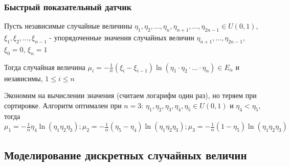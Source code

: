 \documentclass[12pt]{article}
\begin{document}
\subsubsection{Быстрый показательный датчик}

\begin{MyTheorem}
    \Ths Пусть независимые случайные величины $\eta_1, \eta_2, \dots, \eta_n, \eta_{n+1}, \dots, \eta_{2n - 1} \in U(0, 1)$, $\xi_1, \xi_2, \dots, \xi_{n - 1}$ - упорядоченные значения случайных величин $\eta_{n + 1}, \dots, \eta_{2n - 1}$, $\xi_0 = 0$, $\xi_n = 1$

    Тогда случайная величина $\mu_i = -\frac{1}{\alpha}(\xi_i - \xi_{i - 1}) \ln (\eta_1 \cdot \eta_2 \cdot \dots \cdot \eta_n) \in E_\alpha$ и независимы, $1 \leq i \leq n$
\end{MyTheorem}

Экономим на вычислении значения (считаем логарифм один раз), но теряем при сортировке. Алгоритм оптимален при $n = 3$: $\eta_1, \eta_2, \eta_3, \eta_4, \eta_5 \in U(0, 1)$ и $\eta_4 < \eta_5$, тогда $\mu_1 = -\frac{1}{\alpha} \eta_4 \ln (\eta_1 \eta_2 \eta_3); \mu_2 = -\frac{1}{\alpha} (\eta_5 - \eta_4) \ln (\eta_1 \eta_2 \eta_3); \mu_3 = -\frac{1}{\alpha} (1 - \eta_5) \ln (\eta_1 \eta_2 \eta_3)$

\subsection{Моделирование дискретных случайных величин}
\end{document}
